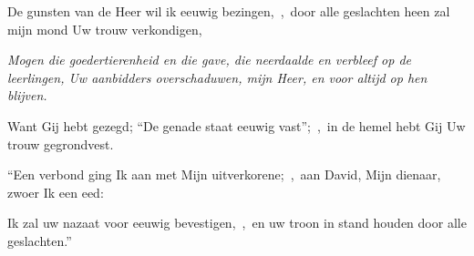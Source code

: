 \documentclass[12pt,twoside,a5paper]{article}
\begin{document}





\begin{halfparskip}

  De gunsten van de Heer wil ik eeuwig bezingen,~\sep\ door alle geslachten heen zal mijn mond Uw trouw verkondigen,


  \liturgicallbracket{} \emph{Mogen die goedertierenheid en die gave, die neerdaalde en verbleef op de leerlingen, Uw aanbidders overschaduwen, mijn Heer, en voor altijd op hen blijven.}\liturgicalrbracket

  Want Gij hebt gezegd; ``De genade staat eeuwig vast'';~\sep\ in de hemel hebt Gij Uw trouw gegrondvest.

  ``Een verbond ging Ik aan met Mijn uitverkorene;~\sep\ aan David, Mijn dienaar, zwoer Ik een eed:

  Ik zal uw nazaat voor eeuwig bevestigen,~\sep\ en uw troon in stand houden door alle geslachten.''
\end{halfparskip}
\end{document}
